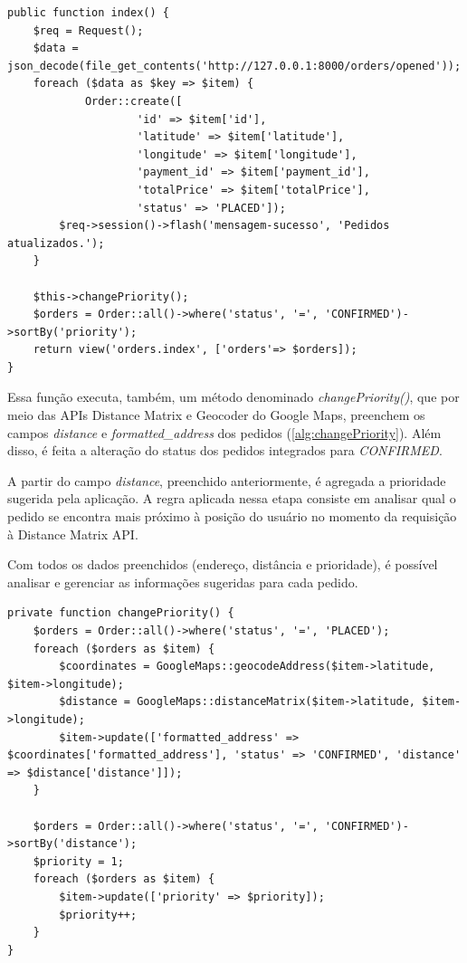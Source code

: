 \begin{lstlisting}[caption={Delivery Routes - Função integradora de pedidos}, style=htmlcssjs, label=alg:orderIndex]
public function index() {
    $req = Request();
    $data = json_decode(file_get_contents('http://127.0.0.1:8000/orders/opened'));
    foreach ($data as $key => $item) {
            Order::create([
                    'id' => $item['id'],
                    'latitude' => $item['latitude'],
                    'longitude' => $item['longitude'],
                    'payment_id' => $item['payment_id'],
                    'totalPrice' => $item['totalPrice'],
                    'status' => 'PLACED']);
        $req->session()->flash('mensagem-sucesso', 'Pedidos atualizados.');
    }

    $this->changePriority();
    $orders = Order::all()->where('status', '=', 'CONFIRMED')->sortBy('priority');
    return view('orders.index', ['orders'=> $orders]);
}
\end{lstlisting}

Essa função executa, também, um método denominado \textit{changePriority()}, que por meio das APIs Distance Matrix e Geocoder do Google Maps, preenchem os campos \textit{distance} e \textit{formatted\_address} dos pedidos (\autoref{alg:changePriority}). Além disso, é feita a alteração do status dos pedidos integrados para \textit{CONFIRMED}.

A partir do campo \textit{distance}, preenchido anteriormente, é agregada a prioridade sugerida pela aplicação. A regra aplicada nessa etapa consiste em analisar qual o pedido se encontra mais próximo à posição do usuário no momento da requisição à Distance Matrix API.

Com todos os dados preenchidos (endereço, distância e prioridade), é possível analisar e gerenciar as informações sugeridas para cada pedido.

\newpage
\begin{lstlisting}[caption={Delivery Routes - Função de troca de prioridade dos pedidos}, style=htmlcssjs, label=alg:changePriority]
 private function changePriority() {
    $orders = Order::all()->where('status', '=', 'PLACED');
    foreach ($orders as $item) {
        $coordinates = GoogleMaps::geocodeAddress($item->latitude, $item->longitude);
        $distance = GoogleMaps::distanceMatrix($item->latitude, $item->longitude);
        $item->update(['formatted_address' => $coordinates['formatted_address'], 'status' => 'CONFIRMED', 'distance' => $distance['distance']]);
    }

    $orders = Order::all()->where('status', '=', 'CONFIRMED')->sortBy('distance');
    $priority = 1;
    foreach ($orders as $item) {
        $item->update(['priority' => $priority]);
        $priority++;
    }
}
\end{lstlisting}